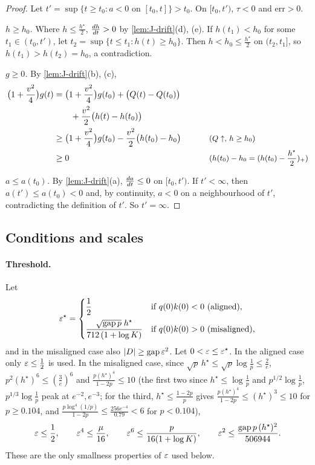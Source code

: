 \begin{proof}
Let $t'=\sup\{t\ge t_0:a<0\text{ on }[t_0,t]\}>t_0$. On $[t_0,t')$, $\tau<0$ and $\mathrm{err}>0$.

\emph{$h\ge h_0$.} Where $h\le\frac{h^\star}{2}$, $\ddt{h}>0$ by \cref{lem:J-drift}(d), (e). If $h(t_1)<h_0$ for some $t_1\in(t_0,t')$, let
$t_2=\sup\{t\le t_1:h(t)\ge h_0\}$. Then $h<h_0\le\frac{h^\star}{2}$ on $(t_2,t_1]$, so $h(t_1)>h(t_2)=h_0$, a contradiction.

\emph{$g\ge0$.} By \cref{lem:J-drift}(b), (c),
\begin{alignat*}{2}
 \bigl(1+\tfrac{v^2}{4}\bigr)g(t)&=\bigl(1+\tfrac{v^2}{4}\bigr)g(t_0)+\bigl(Q(t)-Q(t_0)\bigr) &\qquad&\\
 &\qquad+\tfrac{v^2}{2}\bigl(h(t)-h(t_0)\bigr)\\
 &\ge\bigl(1+\tfrac{v^2}{4}\bigr)g(t_0)-\tfrac{v^2}{2}\bigl(h(t_0)-h_0\bigr) && \why{$Q\uparrow$, $h\ge h_0$}\\
 &\ge0 && \why{$h(t_0)-h_0=(h(t_0)-\tfrac{h^\star}{2})_+$}
\end{alignat*}

\emph{$a\le a(t_0)$.} By \cref{lem:J-drift}(a), $\ddt{a}\le0$ on $[t_0,t')$. If $t'<\infty$, then $a(t')\le a(t_0)<0$ and, by continuity, $a<0$ on a
neighbourhood of $t'$, contradicting the definition of $t'$. So $t'=\infty$.
\end{proof}

\subsection{Conditions and scales}
\label{app:J-constants}

\paragraph{Threshold.} Let
\[
 \varepsilon^\star=\begin{cases}\dfrac{1}{2}&\text{if }q(0)k(0)<0\ \text{(aligned)},\\[8pt]
 \dfrac{\sqrt{\mathrm{gap}\,p}\;h^\star}{712\,(1+\log K)}&\text{if }q(0)k(0)>0\ \text{(misaligned)},\end{cases}
\]
and in the misaligned case also $|D|\ge\mathrm{gap}\,\varepsilon^2$. Let $0<\varepsilon\le\varepsilon^\star$. In the aligned case only $\varepsilon\le\frac{1}{2}$ is used.
In the misaligned case, since $\sqrt p\,h^\star\le\sqrt p\log\frac{1}{p}\le\frac{2}{e}$, $p^2(h^\star)^6\le(\frac{3}{e})^6$ and $\frac{p(h^\star)^4}{1-2p}\le10$
(the first two since $h^\star\le\log\frac1p$ and $p^{1/2}\log\frac1p$, $p^{1/3}\log\frac1p$ peak at $e^{-2},e^{-3}$; for the third,
$h^\star\le\frac{1-2p}{p}$ gives $\frac{p(h^\star)^4}{1-2p}\le(h^\star)^3\le10$ for $p\ge0.104$, and $\frac{p\log^4(1/p)}{1-2p}\le\frac{256e^{-4}}{0.79}<6$ for $p<0.104$),
\begin{equation}
 \varepsilon\le\frac{1}{2},\qquad \varepsilon^4\le\frac{\mu}{16},\qquad \varepsilon^6\le\frac{p}{16(1+\log K)},\qquad
 \varepsilon^2\le\frac{\mathrm{gap}\,p\,(h^\star)^2}{506944}.
 \label{eq:J-eps}
\end{equation}
These are the only smallness properties of $\varepsilon$ used below.

